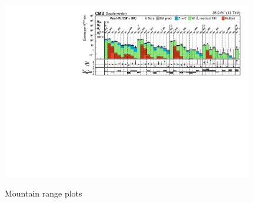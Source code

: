 \begin{figure}
\begin{center}
{            \includegraphics[width=0.98\textwidth]{Supplementary/FullBinning_results_6+_jets_full-fit-bg_aux}
            \label{fig:full_6jet_full-fit}} \\
        \caption{ Mountain range plots
        }
        \label{fig:T1qqqqLL}
    \end{center}
\end{figure}

